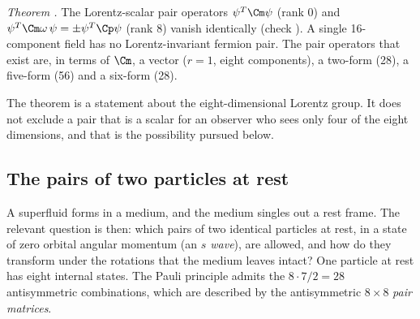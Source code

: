 \emph{Theorem .} The Lorentz-scalar pair operators $\psi^T\Cm\psi$ (rank 0) and
$\psi^T\Cm\omega\,\psi=\pm\psi^T\Cp\psi$ (rank 8) vanish identically (check
). A single 16-component field has no Lorentz-invariant fermion
pair. The pair operators that exist are, in terms of $\Cm$, a vector ($r=1$, eight components), a
two-form (28), a five-form (56) and a six-form (28).

The theorem is a statement about the eight-dimensional Lorentz group. It does not exclude a pair that
is a scalar for an observer who sees only four of the eight dimensions, and that is the possibility
pursued below.

\subsection{The pairs of two particles at rest}
\label{sec:pairsrest}

A superfluid forms in a medium, and the medium singles out a rest frame. The relevant question is
then: which pairs of two identical particles at rest, in a state of zero orbital angular momentum (an
\emph{$s$ wave}), are allowed, and how do they transform under the rotations that the medium leaves
intact? One particle at rest has eight internal states. The Pauli principle admits the
$8\cdot7/2=28$ antisymmetric combinations, which are described by the antisymmetric $8\times8$
\emph{pair matrices}.

